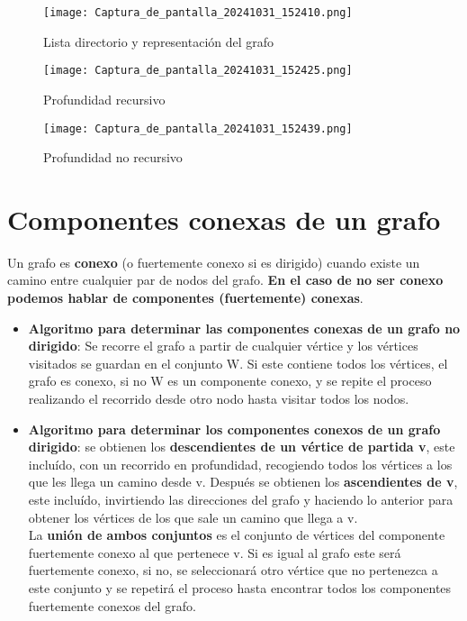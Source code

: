 \documentclass{article}
\begin{document}
\begin{figure}[h]
    \centering
    \texttt{[image: Captura\_de\_pantalla\_20241031\_152410.png]}
    \caption{Lista directorio y representación del grafo}
    \label{fig:etiqueta}
\end{figure}

\begin{figure}[h]
    \centering
    \texttt{[image: Captura\_de\_pantalla\_20241031\_152425.png]}
    \caption{Profundidad recursivo}
    \label{fig:etiqueta}
\end{figure}

\begin{figure}[h]
    \centering
    \texttt{[image: Captura\_de\_pantalla\_20241031\_152439.png]}
    \caption{Profundidad no recursivo}
    \label{fig:etiqueta}
\end{figure}



\section{Componentes conexas de un grafo}
Un grafo es \textbf{conexo} (o fuertemente conexo si es dirigido) cuando existe un camino entre cualquier par de nodos del grafo. \textbf{En el caso de no ser conexo podemos hablar de componentes (fuertemente) conexas}. \\

\begin{itemize}
    \item \textbf{Algoritmo para determinar las componentes conexas de un grafo no dirigido}: Se recorre el grafo a partir de cualquier vértice y los vértices visitados se guardan en el conjunto W. Si este contiene todos los vértices, el grafo es conexo, si no W es un componente conexo, y se repite el proceso realizando el recorrido desde otro nodo hasta visitar todos los nodos.
    

    \item \textbf{Algoritmo para determinar los componentes conexos de un grafo dirigido}: se obtienen los \textbf{descendientes de un vértice de partida v}, este incluído, con un recorrido en profundidad, recogiendo todos los vértices a los que les llega un camino desde v. Después se obtienen los \textbf{ascendientes de v}, este incluído, invirtiendo las direcciones del grafo y haciendo lo anterior para obtener los vértices de los que sale un camino que llega a v. \\
    La \textbf{unión de ambos conjuntos} es el conjunto de vértices del componente fuertemente conexo al que pertenece v. Si es igual al grafo este será fuertemente conexo, si no, se seleccionará otro vértice que no pertenezca a este conjunto y se repetirá el proceso hasta encontrar todos los componentes fuertemente conexos del grafo. \\

\end{itemize}
\end{document}

